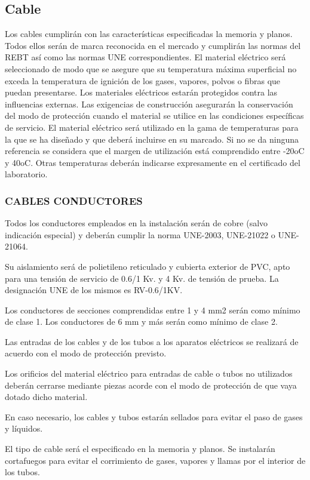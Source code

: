 \documentclass{article}
\begin{document}
\subsection{Cable}
\Cable
Los cables cumplirán con las características especificadas la memoria y planos. Todos ellos serán de marca reconocida en el mercado y cumplirán las normas del REBT así como las normas UNE correspondientes. El material eléctrico será seleccionado de modo que se asegure que su temperatura máxima superficial no exceda la temperatura de ignición de los gases, vapores, polvos o fibras que puedan presentarse. Los materiales eléctricos estarán protegidos contra las influencias externas. Las exigencias de construcción asegurarán la conservación del modo de protección cuando el material se utilice en las condiciones específicas de servicio. El material eléctrico será utilizado en la gama de temperaturas para la que se ha diseñado y que deberá incluirse en su marcado. Si no se da ninguna referencia se considera que el margen de utilización está comprendido entre  -20oC y 40oC. Otras temperaturas deberán indicarse expresamente en el certificado del laboratorio.


\subsubsection{ CABLES CONDUCTORES}

Todos los conductores empleados en la instalación serán de cobre (salvo indicación especial) y deberán cumplir la norma UNE-2003, UNE-21022 o UNE-21064.

Su aislamiento será de polietileno reticulado y cubierta exterior de PVC, apto para una tensión de servicio de 0.6/1 Kv. y 4 Kv. de tensión de prueba. La designación UNE de los mismos es RV-0.6/1KV.

Los conductores de secciones comprendidas entre 1 y 4 mm2  serán como mínimo de clase 1. Los conductores de 6 mm y más serán como mínimo de clase 2.

Las entradas de los cables y de los tubos a los aparatos eléctricos se realizará de acuerdo con el modo de protección  previsto.

Los orificios del material eléctrico para entradas de cable o tubos no utilizados deberán cerrarse mediante piezas acorde con el modo de protección de que vaya dotado dicho material.

En caso necesario, los cables y tubos estarán sellados para evitar el paso de gases y líquidos.

El tipo de cable será el especificado en la memoria y planos. Se instalarán cortafuegos para evitar el corrimiento de gases, vapores y llamas por el interior de los tubos.
\end{document}
